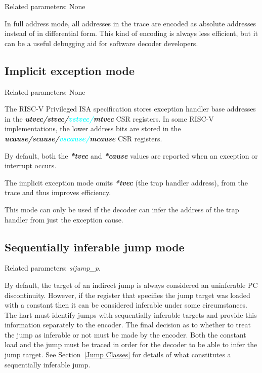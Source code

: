 Related parameters: None

In full address mode, all addresses in the trace are encoded as absolute addresses instead
of in differential form. This kind of encoding is always less efficient, but it can be a useful 
debugging aid for software decoder developers.

\subsection{Implicit exception mode} \label{sec:implicit-exception}

Related parameters: None

The RISC-V Privileged ISA specification stores exception handler base
addresses in the \textbf{\textit{utvec/stvec/\textcolor{cyan}{vstvec/}mtvec}} CSR registers.
In some RISC-V implementations, the lower address bits are stored in
the \textbf{\textit{ucause/scause/\textcolor{cyan}{vscause/}mcause}} CSR registers.

By default, both the \textbf{\textit{*tvec}} and \textbf{\textit{*cause}} 
values are reported when an exception or interrupt occurs.

The implicit exception mode omits \textbf{\textit{*tvec}} (the trap handler address), 
from the trace and thus improves efficiency.

This mode can only be used if the decoder can infer the address of the trap handler
from just the exception cause.

\subsection{Sequentially inferable jump mode} \label{sec:si-jump}

Related parameters: \textit{sijump\_p}.

By default, the target of an indirect jump is always considered an uninferable PC discontinuity.  
However, if the register that specifies the jump target was loaded with a constant then it
can be considered inferable under some circumstances.  The hart must identify jumps with 
sequentially inferable targets and provide this information separately to the encoder.  The
final decision as to whether to treat the jump as inferable or not must be made by the encoder.
Both the constant load and the jump must be traced in order for the decoder to be able to
infer the jump target.  See Section~\ref{Jump Classes} for details of what constitutes a sequentially
inferable jump.

